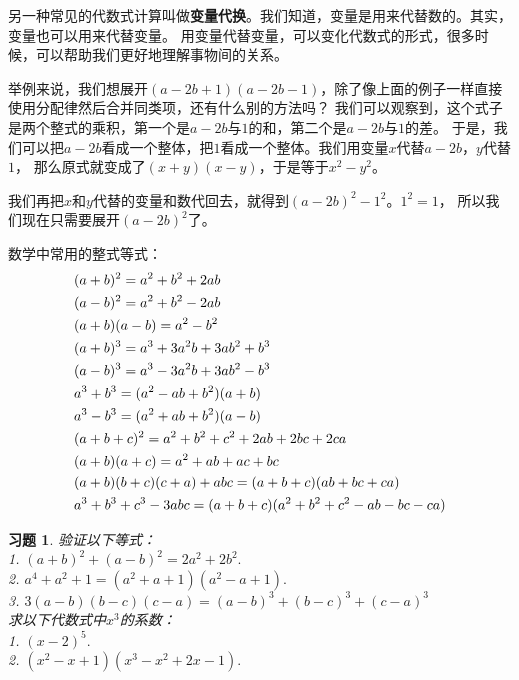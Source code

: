 \documentclass[12pt,UTF8]{ctexbook}
\newtheorem{xt}{习题}[section]
\begin{document}
另一种常见的代数式计算叫做\textbf{变量代换}。我们知道，变量是用来代替数的。其实，变量也可以用来代替变量。
用变量代替变量，可以变化代数式的形式，很多时候，可以帮助我们更好地理解事物间的关系。

举例来说，我们想展开$(a - 2b + 1)(a - 2b - 1)$，除了像上面的例子一样直接使用分配律然后合并同类项，还有什么别的方法吗？
我们可以观察到，这个式子是两个整式的乘积，第一个是$a - 2b$与$1$的和，第二个是$a - 2b$与$1$的差。
于是，我们可以把$a - 2b$看成一个整体，把$1$看成一个整体。我们用变量$x$代替$a - 2b$，$y$代替$1$，
那么原式就变成了$(x + y)(x - y)$，于是等于$x^2 - y^2$。

我们再把$x$和$y$代替的变量和数代回去，就得到$(a - 2b)^2 - 1^2$。$1^2 = 1$，
所以我们现在只需要展开$(a - 2b)^2$了。

数学中常用的整式等式：
\begin{align}
    &(a + b)^2 = a^2 + b^2 + 2ab \notag \\
    &(a - b)^2 = a^2 + b^2 - 2ab \notag \\
    &(a + b)(a - b) = a^2 - b^2 \notag \\
    &(a + b)^3 = a^3 + 3a^2b + 3ab^2 + b^3 \notag \\
    &(a - b)^3 = a^3 - 3a^2b + 3ab^2 - b^3 \notag \\
    &a^3 + b^3 = (a^2 - ab + b^2)(a + b) \notag \\
    &a^3 - b^3 = (a^2 + ab + b^2)(a - b) \notag \\
    &(a + b + c)^2 = a^2 + b^2 + c^2 + 2ab + 2bc + 2ca \notag \\
    &(a + b)(a + c) = a^2 + ab + ac + bc \notag \\
    &(a + b)(b + c)(c + a) + abc = (a + b + c)(ab + bc + ca) \notag \\
    &a^3+b^3+c^3 - 3abc = (a + b + c)(a^2+b^2+c^2-ab-bc-ca) \notag 
\end{align}
\begin{xt}\label{xt:5-0-0}
    验证以下等式：\\
    1. $(a + b)^2 + (a - b)^2 = 2a^2+2b^2.$\\
    2. $a^4 + a^2 + 1 = (a^2+a+1)(a^2-a+1).$\\
    3. $3(a-b)(b-c)(c-a) = (a-b)^3+(b-c)^3+(c-a)^3$\\
    求以下代数式中$x^3$的系数：\\
    1. $(x - 2)^5.$\\
    2. $(x^2 - x + 1)(x^3 - x^2 +2x - 1).$
\end{xt}
\end{document}
